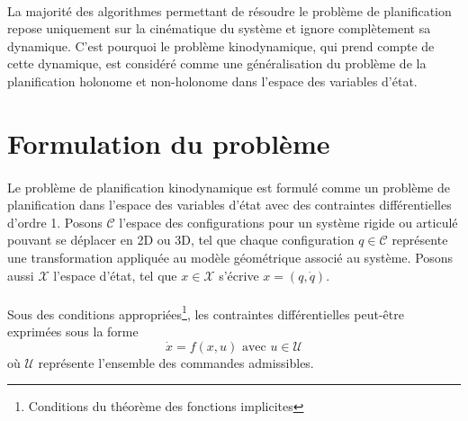 \documentclass[12pt]{article}
\begin{document}
\paragraph{}
La majorité des algorithmes permettant de résoudre le problème de planification repose uniquement sur la cinématique du système et ignore complètement sa dynamique. C'est pourquoi le problème kinodynamique, qui prend compte de cette dynamique, est considéré comme une généralisation du problème de la planification holonome et non-holonome dans l'espace des variables d'état.


\section{Formulation du problème}

\paragraph{}
Le problème de planification kinodynamique est formulé comme un problème de planification dans l'espace des variables d'état avec des contraintes différentielles d'ordre 1. Posons $\mathcal{C}$ l'espace des configurations pour un système rigide ou articulé pouvant se déplacer en 2D ou 3D, tel que chaque configuration $q \in \mathcal{C}$ représente une transformation appliquée au modèle géométrique associé au système. Posons aussi $\mathcal{X}$ l'espace d'état, tel que $x \in \mathcal{X}$ s'écrive $x=(q,\dot{q})$.

\paragraph{}
Sous des conditions appropriées\footnote{Conditions du théorème des fonctions implicites}, les contraintes différentielles peut-être exprimées sous la forme
\begin{equation}
\label{eqdiff}
\dot{x}=f(x,u) \text{ avec } u \in \mathcal{U}
\end{equation}
où $\mathcal{U}$ représente l'ensemble des commandes admissibles.
\end{document}
